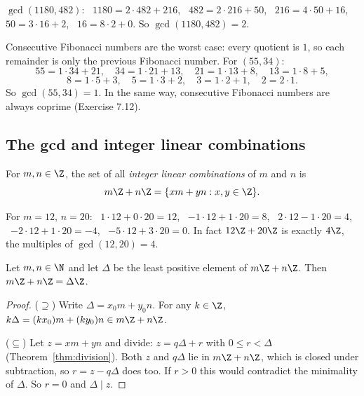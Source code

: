 \begin{example}
$\gcd(1180,482)$: \ $1180=2\cdot482+216$, \ $482=2\cdot216+50$, \ $216=4\cdot50+16$, \ $50=3\cdot16+2$, \ $16=8\cdot2+0$. So $\gcd(1180,482)=2$.
\end{example}

\begin{example}
Consecutive Fibonacci numbers are the worst case: every quotient is $1$, so each remainder is only the previous Fibonacci number. For $(55,34)$:
\[
55=1\cdot34+21,\quad 34=1\cdot21+13,\quad 21=1\cdot13+8,\quad 13=1\cdot8+5,
\]
\[
8=1\cdot5+3,\quad 5=1\cdot3+2,\quad 3=1\cdot2+1,\quad 2=2\cdot1.
\]
So $\gcd(55,34)=1$. In the same way, consecutive Fibonacci numbers are always coprime (Exercise 7.12).
\end{example}

\subsection{The gcd and integer linear combinations}
\label{sec:7-7}

\begin{definition}
For $m,n\in\Z$, the set of all \emph{integer linear combinations} of $m$ and $n$ is
\[
m\Z+n\Z=\{xm+yn : x,y\in\Z\}.
\]
\end{definition}

\begin{example}
For $m=12$, $n=20$: \ $1\cdot12+0\cdot20=12$, \ $-1\cdot12+1\cdot20=8$, \ $2\cdot12-1\cdot20=4$, \ $-2\cdot12+1\cdot20=-4$, \ $-5\cdot12+3\cdot20=0$. In fact $12\Z+20\Z$ is exactly $4\Z$, the multiples of $\gcd(12,20)=4$.
\end{example}

\begin{lemma}
\label{thm:deltaZ}
Let $m,n\in\N$ and let $\Delta$ be the least positive element of $m\Z+n\Z$. Then $m\Z+n\Z=\Delta\Z$.
\end{lemma}
\begin{proof}
($\supseteq$) Write $\Delta=x_0m+y_0n$. For any $k\in\Z$, $k\Delta=(kx_0)m+(ky_0)n\in m\Z+n\Z$.

($\subseteq$) Let $z=xm+yn$ and divide: $z=q\Delta+r$ with $0\le r<\Delta$ (Theorem~\ref{thm:division}). Both $z$ and $q\Delta$ lie in $m\Z+n\Z$, which is closed under subtraction, so $r=z-q\Delta$ does too. If $r>0$ this would contradict the minimality of $\Delta$. So $r=0$ and $\Delta\mid z$.
\end{proof}

